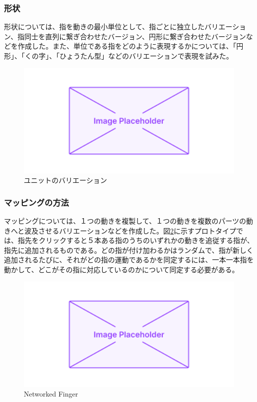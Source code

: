 \subsubsection*{形状}
形状については、指を動きの最小単位として、指ごとに独立したバリエーション、指同士を直列に繋ぎ合わせたバージョン、円形に繋ぎ合わせたバージョンなどを作成した。また、単位である指をどのように表現するかについては、「円形」、「くの字」、「ひょうたん型」などのバリエーションで表現を試みた。
\begin{figure}[H]
  \centering
  \includegraphics[width=15cm]{img/placeholder.png}
  \caption{ユニットのバリエーション}
  \label{fig:unit_valiation}
\end{figure}
\subsubsection*{マッピングの方法}
マッピングについては、１つの動きを複製して、１つの動きを複数のパーツの動きへと波及させるバリエーションなどを作成した。図\ref{fig:networked_finger}に示すプロトタイプでは、指先をクリックすると５本ある指のうちのいずれかの動きを追従する指が、指先に追加されるものである。どの指が付け加わるかはランダムで、指が新しく追加されるたびに、それがどの指の運動であるかを同定するには、一本一本指を動かして、どこがその指に対応しているのかについて同定する必要がある。
\begin{figure}[H]
  \centering
  \includegraphics[width=15cm]{img/placeholder.png}
  \caption{Networked Finger}
  \label{fig:networked_finger}
\end{figure}

